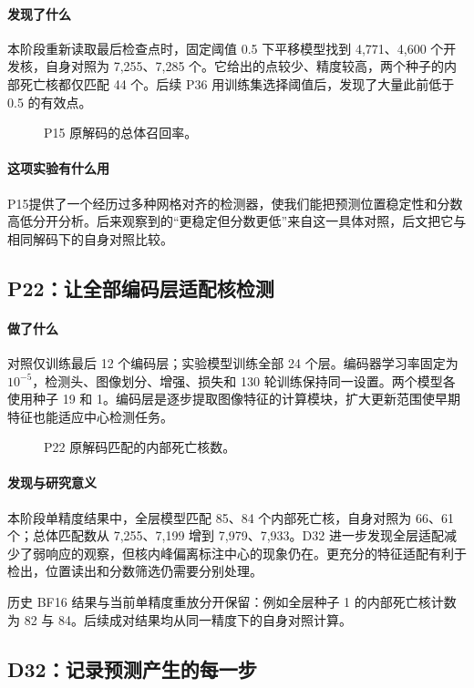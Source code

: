 \documentclass[
  12pt,
  fontset=fandol]{ctexart}
\begin{document}
\paragraph{发现了什么}
本阶段重新读取最后检查点时，固定阈值 0.5 下平移模型找到 4,771、4,600 个开发核，自身对照为 7,255、7,285 个。它给出的点较少、精度较高，两个种子的内部死亡核都仅匹配 44 个。后续 P36 用训练集选择阈值后，发现了大量此前低于 0.5 的有效点。

\begin{figure}[H]\centering\caption{P15 原解码的总体召回率。}\end{figure}
\paragraph{这项实验有什么用}
P15提供了一个经历过多种网格对齐的检测器，使我们能把预测位置稳定性和分数高低分开分析。后来观察到的“更稳定但分数更低”来自这一具体对照，后文把它与相同解码下的自身对照比较。

\subsection{P22：让全部编码层适配核检测}\label{chapter6}
\paragraph{做了什么}
对照仅训练最后 12 个编码层；实验模型训练全部 24 个层。编码器学习率固定为 $10^{-5}$，检测头、图像划分、增强、损失和 130 轮训练保持同一设置。两个模型各使用种子 19 和 1。编码层是逐步提取图像特征的计算模块，扩大更新范围使早期特征也能适应中心检测任务。

\begin{figure}[H]\centering\caption{P22 原解码匹配的内部死亡核数。}\end{figure}
\paragraph{发现与研究意义}
本阶段单精度结果中，全层模型匹配 85、84 个内部死亡核，自身对照为 66、61 个；总体匹配数从 7,255、7,199 增到 7,979、7,933。D32 进一步发现全层适配减少了弱响应的观察，但核内峰偏离标注中心的现象仍在。更充分的特征适配有利于检出，位置读出和分数筛选仍需要分别处理。

历史 BF16 结果与当前单精度重放分开保留：例如全层种子 1 的内部死亡核计数为 82 与 84。后续成对结果均从同一精度下的自身对照计算。

\subsection{D32：记录预测产生的每一步}\label{chapter7}
\end{document}
